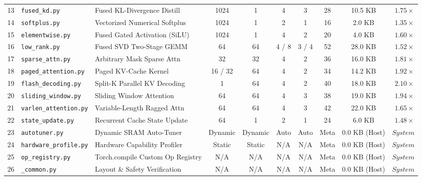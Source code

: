 \begin{table}[p]
\begin{tabular}{rllccccccr}
13 & \texttt{fused\_kd.py} & Fused KL-Divergence Distill & 1024 & 1 & 4 & 3 & 28 & 10.5 KB & $1.75\times$ \\
14 & \texttt{softplus.py} & Vectorized Numerical Softplus & 1024 & 1 & 2 & 1 & 16 & 2.0 KB & $1.35\times$ \\
15 & \texttt{elementwise.py} & Fused Gated Activation (SiLU) & 1024 & 1 & 4 & 2 & 20 & 4.0 KB & $1.60\times$ \\
16 & \texttt{low\_rank.py} & Fused SVD Two-Stage GEMM & 64 & 64 & 4 / 8 & 3 / 4 & 52 & 28.0 KB & $1.52\times$ \\
17 & \texttt{sparse\_attn.py} & Arbitrary Mask Sparse Attn & 32 & 32 & 4 & 2 & 36 & 16.0 KB & $1.81\times$ \\
18 & \texttt{paged\_attention.py} & Paged KV-Cache Kernel & 16 / 32 & 64 & 4 & 2 & 34 & 14.2 KB & $1.92\times$ \\
19 & \texttt{flash\_decoding.py} & Split-K Parallel KV Decoding & 1 & 64 & 4 & 2 & 40 & 18.0 KB & $2.10\times$ \\
20 & \texttt{sliding\_window.py} & Sliding Window Attention & 64 & 64 & 4 & 3 & 38 & 19.0 KB & $1.94\times$ \\
21 & \texttt{varlen\_attention.py} & Variable-Length Ragged Attn & 64 & 64 & 4 & 3 & 42 & 22.0 KB & $1.65\times$ \\
22 & \texttt{state\_update.py} & Recurrent Cache State Update & 64 & 1 & 2 & 1 & 24 & 6.0 KB & $1.48\times$ \\
23 & \texttt{autotuner.py} & Dynamic SRAM Auto-Tuner & Dynamic & Dynamic & Auto & Auto & Meta & 0.0 KB (Host) & $System$ \\
24 & \texttt{hardware\_profile.py} & Hardware Capability Profiler & Static & Static & N/A & N/A & Meta & 0.0 KB (Host) & $System$ \\
25 & \texttt{op\_registry.py} & Torch.compile Custom Op Registry & N/A & N/A & N/A & N/A & Meta & 0.0 KB (Host) & $System$ \\
26 & \texttt{\_common.py} & Layout \& Safety Verification & N/A & N/A & N/A & N/A & Meta & 0.0 KB (Host) & $System$ \\
\bottomrule
\end{tabular}
\end{table}
